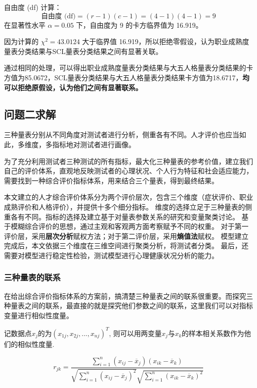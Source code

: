 \documentclass[withoutpreface,bwprint]{cumcmthesis} %
\begin{document}
自由度 (df) 计算：
\[
\text{自由度 (df)} = (r - 1)(c - 1) = (4 - 1)(4 - 1) = 9
\]
在显著性水平 \(\alpha = 0.05\) 下，自由度为 9 的卡方临界值为 16.919。

因为计算的 \(\chi^2 = 43.0124\) 大于临界值 16.919，所以拒绝零假设，认为职业成熟度量表分类结果与SCL量表分类结果之间有显著关联。

通过相同的处理，可以得出职业成熟度量表分类结果与大五人格量表分类结果的卡方值为85.0672，SCL量表分类结果与大五人格量表分类结果卡方值为18.6717，\textbf{均可以拒绝原假设，认为他们之间有显著联系。}



\subsection{问题二求解}

三种量表分别从不同角度对测试者进行分析，侧重各有不同。人才评价也应当如此，多维度，多指标地对测试者进行画像。

为了充分利用测试者三种测试的所有指标，最大化三种量表的参考价值，建立我们自己的评价体系，直观地反映测试者的心理状况、个人行为特征和社会适应能力，
需要找到一种综合评价指标体系，用来结合三个量表，得到最终结果。

本文建立的人才综合评价体系分为两个评价层次，包含三个维度（症状评价、职业成熟评价和人格评价），并提供十多个细分指标。
维度的选择立足于三种量表的侧重各有不同。指标的选择及建立基于对量表参数关系的研究和变量聚类讨论。
基于模糊综合评价的思想，通过主观和客观两方面考察赋予不同的权重。
对于第一评价层，采用\textbf{层次分析}赋权方法；对于第二评价层，采用\textbf{熵值法}赋权。
模型建立完成后，本文依据三个维度在三维空间进行聚类分析，将测试者分类。
最后，还需要对模型进行稳定性检验，测试模型进行心理健康状况分析的能力。



\subsubsection{三种量表的联系}

在给出综合评价指标体系的方案前，搞清楚三种量表之间的联系很重要。而探究三种量表之间的联系，最直接的就是探究他们参数之间的联系，这里我们可以对指标变量进行相似性度量。

记数据点$x_j$的为$(x_{1j}, x_{2j}, ... , x_{nj})^T$, 则可以用两变量$x_j$与$x_k$的样本相关系数作为他们的相似性度量.

\begin{equation}
r_{jk} = \frac{\sum_{i=1}^n (x_{ij} - \overline{x}_j)(x_{ik} - \overline{x}_k)}{\sqrt{\sum_{i=1}^n (x_{ij} - \overline{x}_j)^2} \sqrt{\sum_{i=1}^n (x_{ik} - \overline{x}_k)^2}}
\end{equation}
\end{document}
